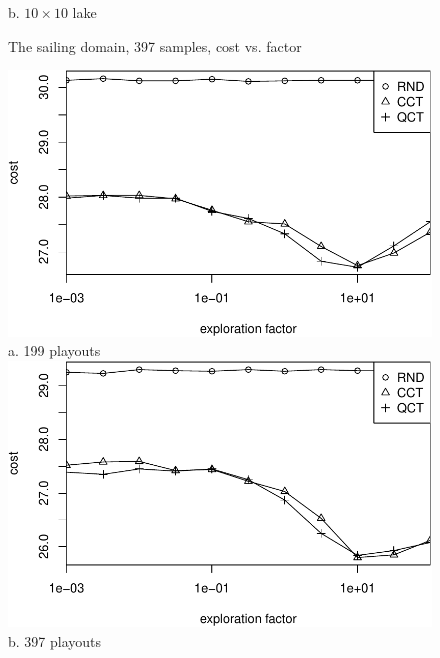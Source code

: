 \documentclass{article}
\begin{document}
\begin{figure}[t]
\begin{minipage}[b]{0.333\linewidth}
    b. $10\times 10$ lake
  \end{minipage}
  \caption{The sailing domain, 397 samples, cost vs. factor}
  \label{fig:sailing-lake-size}
\end{figure}

\begin{figure}[t]
  \begin{minipage}[b]{0.5\linewidth}
    \centering
    \includegraphics[scale=0.45]{rcq-size=6-nsamples=199.pdf}\\
    a. 199 playouts\\
    \vspace{1em}
    \includegraphics[scale=0.45]{rcq-size=6-nsamples=397.pdf}\\
    b. 397 playouts\\
  \end{minipage}
  \begin{minipage}[b]{0.5\linewidth}
    \centering

\end{minipage}
\end{figure}
\end{document}
